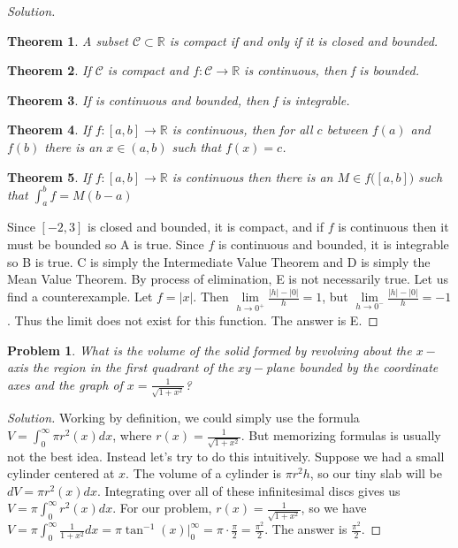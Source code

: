\documentclass[crop=false,class=book]{standalone}
\theoremstyle{mystyle}
\newtheorem{problem}{Problem}[section]
\newtheorem*{theorem*}{Theorem}
\begin{document}
\begin{proof}[Solution]
\begin{theorem*}
A subset $\mathcal{C}\subset \mathbb{R}$ is compact if and only if it is closed and bounded.
\end{theorem*}
\begin{theorem*}
If $\mathcal{C}$ is compact and $f:\mathcal{C}\rightarrow \mathbb{R}$ is continuous, then f is bounded.
\end{theorem*}
\begin{theorem*}
If is continuous and bounded, then f is integrable.
\end{theorem*}
\begin{theorem*}
If $f:[a,b] \rightarrow \mathbb{R}$ is continuous, then for all $c$ between $f(a)$ and $f(b)$ there is an $x\in (a,b)$ such that $f(x) = c$.
\end{theorem*}
\begin{theorem*}
If $f:[a,b]\rightarrow \mathbb{R}$ is continuous then there is an $M\in f\big([a,b]\big)$ such that $\int_{a}^{b}f = M(b-a)$
\end{theorem*}
Since $[-2,3]$ is closed and bounded, it is compact, and if $f$ is continuous then it must be bounded so A is true. Since $f$ is continuous and bounded, it is integrable so B is true. C is simply the Intermediate Value Theorem and D is simply the Mean Value Theorem. By process of elimination, E is not necessarily true. Let us find a counterexample. Let $f=|x|$. Then $\underset{h\rightarrow 0^+}\lim \frac{|h|-|0|}{h} = 1$, but $\underset{h\rightarrow 0^{-}}\lim \frac{|h|-|0|}{h} = -1$. Thus the limit does not exist for this function. The answer is E.
\end{proof}
\begin{problem}
What is the volume of the solid formed by revolving about the $x-$axis the region in the first quadrant of the $xy-$plane bounded by the coordinate axes and the graph of $x = \frac{1}{\sqrt{1+x^2}}$?
\end{problem}
\begin{proof}[Solution]
Working by definition, we could simply use the formula $V = \int_{0}^{\infty}\pi r^2(x)dx$, where $r(x) = \frac{1}{\sqrt{1+x^2}}$. But memorizing formulas is usually not the best idea. Instead let's try to do this intuitively. Suppose we had a small cylinder centered at $x$. The volume of a cylinder is $\pi r^2 h$, so our tiny slab will be $dV = \pi r^2(x) dx$. Integrating over all of these infinitesimal discs gives us $V = \pi \int_{0}^{\infty}r^2(x)dx$. For our problem, $r(x) = \frac{1}{\sqrt{1+x^2}}$, so we have $V = \pi \int_{0}^{\infty} \frac{1}{1+x^2}dx = \pi \tan^{-1}(x)\big|_{0}^{\infty} = \pi \cdot \frac{\pi}{2} = \frac{\pi^2}{2}$. The answer is $\frac{\pi^2}{2}$.
\end{proof}
\end{document}
